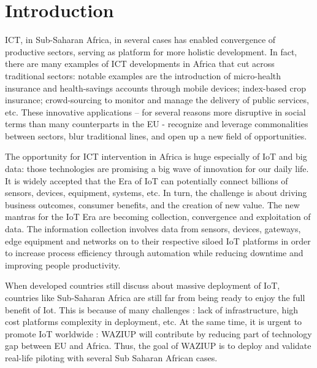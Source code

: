 
\section{Introduction}

ICT, in Sub-Saharan Africa, in several cases has enabled convergence of productive sectors, serving as platform for more holistic development.
In fact, there are many examples of ICT developments in Africa that cut across traditional sectors: notable examples are the introduction of micro-health insurance and health-savings accounts through mobile devices; index-based crop insurance; crowd-sourcing to monitor and manage the delivery of public services, etc.
These innovative applications – for several reasons more disruptive in social terms than many counterparts in the EU - recognize and leverage commonalities between sectors, blur traditional lines, and open up a new field of opportunities.

The opportunity for ICT intervention in Africa is huge especially of IoT and big data: those technologies are promising a big wave of innovation for our daily life.
It is widely accepted that the Era of IoT can potentially connect billions of sensors, devices, equipment, systems, etc.
In turn, the challenge is about driving business outcomes, consumer benefits, and the creation of new value.
The new mantras for the IoT Era are becoming collection, convergence and exploitation of data.
The information collection involves data from sensors, devices, gateways, edge equipment and networks on to their respective siloed IoT platforms in order to increase process efficiency through automation while reducing downtime and improving people productivity.

When developed countries still discuss about massive deployment of IoT, countries like Sub-Saharan Africa are still far from being ready to enjoy the full benefit of Iot. 
This is because of many challenges : lack of infrastructure, high cost platforms complexity in deployment, etc. 
At the same time, it is urgent to promote IoT worldwide : WAZIUP will contribute by reducing part of technology gap between EU and Africa. 
Thus, the goal of WAZIUP is to deploy and validate real-life piloting with several Sub Saharan African cases. 

